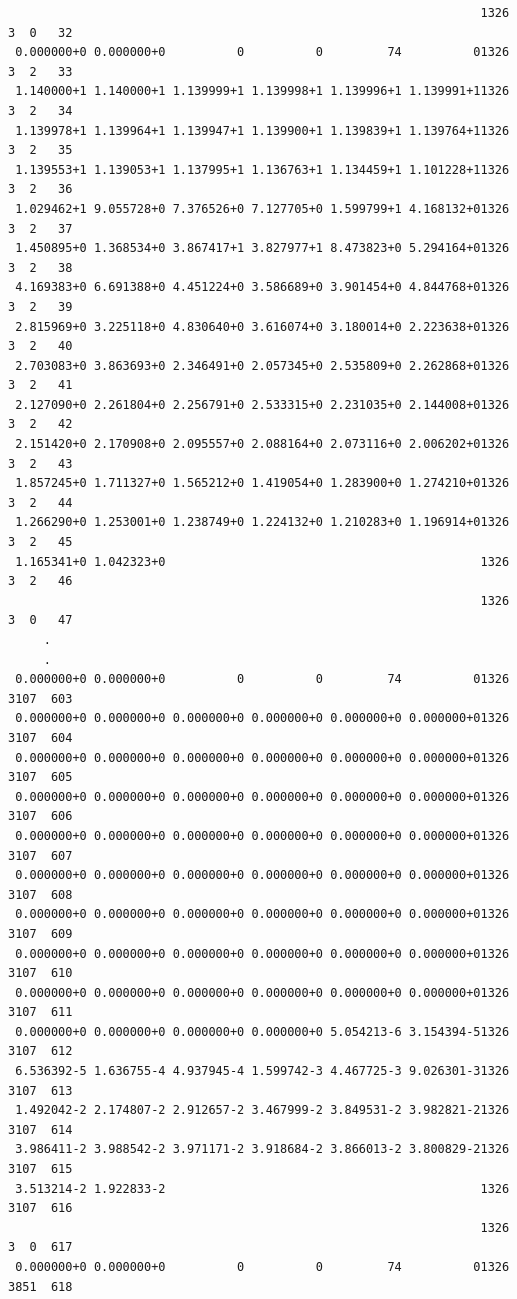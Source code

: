 \begin{verbatim}
                                                                  1326 3  0   32
 0.000000+0 0.000000+0          0          0         74          01326 3  2   33
 1.140000+1 1.140000+1 1.139999+1 1.139998+1 1.139996+1 1.139991+11326 3  2   34
 1.139978+1 1.139964+1 1.139947+1 1.139900+1 1.139839+1 1.139764+11326 3  2   35
 1.139553+1 1.139053+1 1.137995+1 1.136763+1 1.134459+1 1.101228+11326 3  2   36
 1.029462+1 9.055728+0 7.376526+0 7.127705+0 1.599799+1 4.168132+01326 3  2   37
 1.450895+0 1.368534+0 3.867417+1 3.827977+1 8.473823+0 5.294164+01326 3  2   38
 4.169383+0 6.691388+0 4.451224+0 3.586689+0 3.901454+0 4.844768+01326 3  2   39
 2.815969+0 3.225118+0 4.830640+0 3.616074+0 3.180014+0 2.223638+01326 3  2   40
 2.703083+0 3.863693+0 2.346491+0 2.057345+0 2.535809+0 2.262868+01326 3  2   41
 2.127090+0 2.261804+0 2.256791+0 2.533315+0 2.231035+0 2.144008+01326 3  2   42
 2.151420+0 2.170908+0 2.095557+0 2.088164+0 2.073116+0 2.006202+01326 3  2   43
 1.857245+0 1.711327+0 1.565212+0 1.419054+0 1.283900+0 1.274210+01326 3  2   44
 1.266290+0 1.253001+0 1.238749+0 1.224132+0 1.210283+0 1.196914+01326 3  2   45
 1.165341+0 1.042323+0                                            1326 3  2   46
                                                                  1326 3  0   47
     .
     .
 0.000000+0 0.000000+0          0          0         74          01326 3107  603
 0.000000+0 0.000000+0 0.000000+0 0.000000+0 0.000000+0 0.000000+01326 3107  604
 0.000000+0 0.000000+0 0.000000+0 0.000000+0 0.000000+0 0.000000+01326 3107  605
 0.000000+0 0.000000+0 0.000000+0 0.000000+0 0.000000+0 0.000000+01326 3107  606
 0.000000+0 0.000000+0 0.000000+0 0.000000+0 0.000000+0 0.000000+01326 3107  607
 0.000000+0 0.000000+0 0.000000+0 0.000000+0 0.000000+0 0.000000+01326 3107  608
 0.000000+0 0.000000+0 0.000000+0 0.000000+0 0.000000+0 0.000000+01326 3107  609
 0.000000+0 0.000000+0 0.000000+0 0.000000+0 0.000000+0 0.000000+01326 3107  610
 0.000000+0 0.000000+0 0.000000+0 0.000000+0 0.000000+0 0.000000+01326 3107  611
 0.000000+0 0.000000+0 0.000000+0 0.000000+0 5.054213-6 3.154394-51326 3107  612
 6.536392-5 1.636755-4 4.937945-4 1.599742-3 4.467725-3 9.026301-31326 3107  613
 1.492042-2 2.174807-2 2.912657-2 3.467999-2 3.849531-2 3.982821-21326 3107  614
 3.986411-2 3.988542-2 3.971171-2 3.918684-2 3.866013-2 3.800829-21326 3107  615
 3.513214-2 1.922833-2                                            1326 3107  616
                                                                  1326 3  0  617
 0.000000+0 0.000000+0          0          0         74          01326 3851  618

\end{verbatim}
